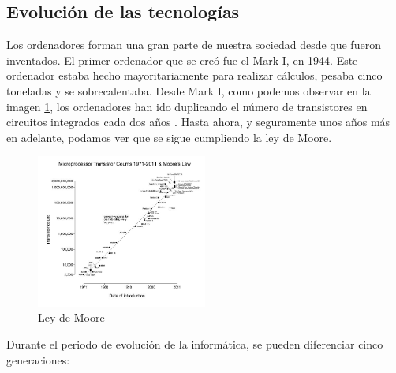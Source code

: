 \documentclass[titlepage, 12pt, a4paper]{article}
\begin{document}
\subsection{Evolución de las tecnologías}
Los ordenadores forman una gran parte de nuestra sociedad desde que fueron inventados. El primer ordenador que se creó fue el Mark I, en 1944. Este ordenador estaba hecho mayoritariamente para realizar cálculos, pesaba cinco toneladas y se sobrecalentaba.
Desde Mark I, como podemos observar en la imagen \ref{fig:moore}, los ordenadores han ido duplicando el número de transistores en circuitos integrados cada dos años \cite{moore}. Hasta ahora, y seguramente unos años más en adelante, podamos ver que se sigue cumpliendo la ley de Moore.
\begin{figure}[H]
    \centering
    \includegraphics[width=0.5\textwidth]{Media/moore.jpg}
    \caption{Ley de Moore}
    \label{fig:moore}
\end{figure}
Durante el periodo de evolución de la informática, se pueden diferenciar cinco generaciones:
\end{document}
